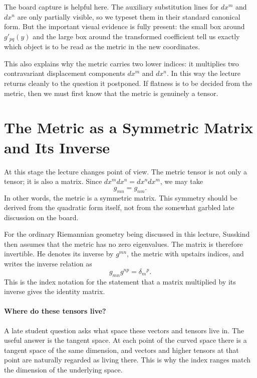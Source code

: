 The board capture is helpful here. The auxiliary substitution lines for \(dx^m\) and \(dx^n\) are only partially visible, so we typeset them in their standard canonical form. But the important visual evidence is fully present: the small box around \(g'_{pq}(y)\) and the large box around the transformed coefficient tell us exactly which object is to be read as the metric in the new coordinates.

This also explains why the metric carries two lower indices: it multiplies two contravariant displacement components \(dx^m\) and \(dx^n\). In this way the lecture returns cleanly to the question it postponed. If flatness is to be decided from the metric, then we must first know that the metric is genuinely a tensor.

\section{The Metric as a Symmetric Matrix and Its Inverse}

At this stage the lecture changes point of view. The metric tensor is not only a tensor; it is also a matrix. Since \(dx^m dx^n = dx^n dx^m\), we may take
\begin{equation}
g_{mn}=g_{nm}.
\end{equation}
In other words, the metric is a symmetric matrix. This symmetry should be derived from the quadratic form itself, not from the somewhat garbled late discussion on the board.

For the ordinary Riemannian geometry being discussed in this lecture, Susskind then assumes that the metric has no zero eigenvalues. The matrix is therefore invertible. He denotes its inverse by \(g^{mn}\), the metric with upstairs indices, and writes the inverse relation as
\begin{equation}
g_{mn}g^{np}=\delta_m{}^p.
\end{equation}
This is the index notation for the statement that a matrix multiplied by its inverse gives the identity matrix.

\paragraph{Where do these tensors live?}
A late student question asks what space these vectors and tensors live in. The useful answer is the tangent space. At each point of the curved space there is a tangent space of the same dimension, and vectors and higher tensors at that point are naturally regarded as living there. This is why the index ranges match the dimension of the underlying space.

